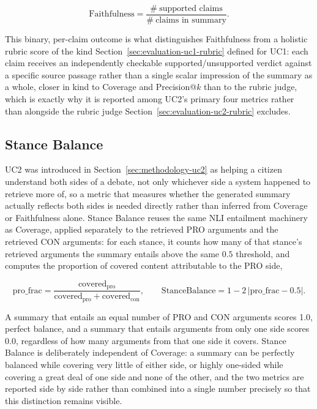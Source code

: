 \begin{equation}
\mathrm{Faithfulness} = \frac{\#\ \text{supported claims}}{\#\ \text{claims in summary}}.
\label{eq:evaluation-faithfulness}
\end{equation}

\noindent This binary, per-claim outcome is what distinguishes Faithfulness from a holistic rubric
score of the kind Section~\ref{sec:evaluation-uc1-rubric} defined for UC1: each claim receives an
independently checkable supported/unsupported verdict against a specific source passage rather than
a single scalar impression of the summary as a whole, closer in kind to Coverage and Precision@$k$
than to the rubric judge, which is exactly why it is reported among UC2's primary four metrics
rather than alongside the rubric judge Section~\ref{sec:evaluation-uc2-rubric} excludes.

\subsection{Stance Balance}
\label{sec:evaluation-uc2-balance}

UC2 was introduced in Section~\ref{sec:methodology-uc2} as helping a citizen understand both sides
of a debate, not only whichever side a system happened to retrieve more of, so a metric that
measures whether the generated summary actually reflects both sides is needed directly rather than
inferred from Coverage or Faithfulness alone. Stance Balance reuses the same NLI entailment
machinery as Coverage, applied separately to the retrieved PRO arguments and the retrieved CON
arguments: for each stance, it counts how many of that stance's retrieved arguments the summary
entails above the same $0.5$ threshold, and computes the proportion of covered content attributable
to the PRO side,

\begin{equation}
\mathrm{pro\_frac} = \frac{\text{covered}_{\text{pro}}}{\text{covered}_{\text{pro}} + \text{covered}_{\text{con}}},
\qquad
\mathrm{StanceBalance} = 1 - 2\,\left| \mathrm{pro\_frac} - 0.5 \right|.
\label{eq:evaluation-balance}
\end{equation}

\noindent A summary that entails an equal number of PRO and CON arguments scores 1.0, perfect
balance, and a summary that entails arguments from only one side scores 0.0, regardless of how many
arguments from that one side it covers. Stance Balance is deliberately independent of Coverage: a
summary can be perfectly balanced while covering very little of either side, or highly one-sided
while covering a great deal of one side and none of the other, and the two metrics are reported
side by side rather than combined into a single number precisely so that this distinction remains
visible.

